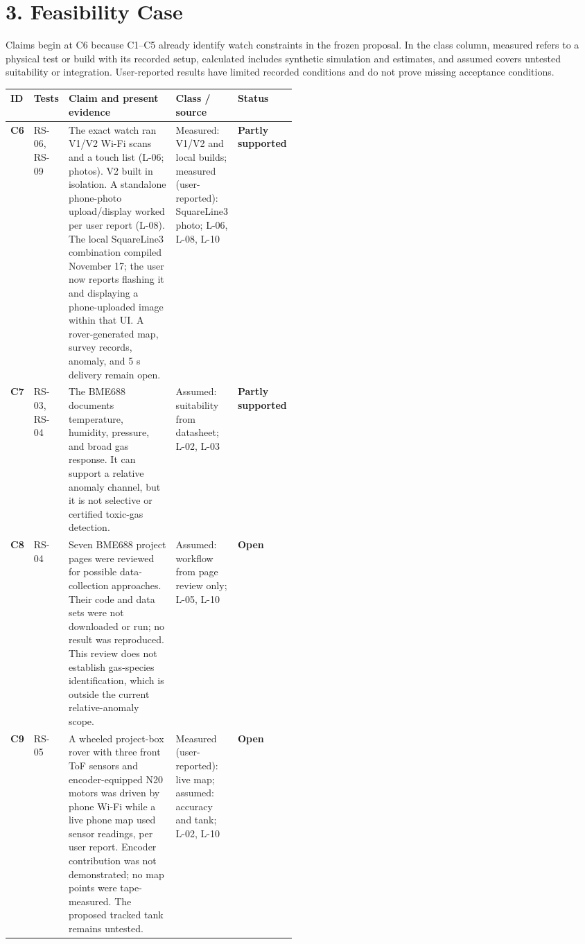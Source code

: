\documentclass[10pt,letterpaper]{article}
\renewcommand{\arraystretch}{1.12}
\newcommand{\openstatus}{\textbf{Open}}
\newcommand{\partialstatus}{\textbf{Partly supported}}
\begin{document}
\newpage
\section*{3. Feasibility Case}

Claims begin at C6 because C1--C5 already identify watch constraints in the frozen proposal. In the class column, measured refers to a physical test or build with its recorded setup, calculated includes synthetic simulation and estimates, and assumed covers untested suitability or integration. User-reported results have limited recorded conditions and do not prove missing acceptance conditions.

\begingroup\footnotesize\renewcommand{\arraystretch}{1.04}
\begin{tabularx}{\linewidth}{>{\bfseries}p{0.055\linewidth}>{\raggedright\arraybackslash}p{0.12\linewidth}X>{\raggedright\arraybackslash}p{0.18\linewidth}>{\raggedright\arraybackslash}p{0.12\linewidth}}
\toprule
ID & Tests & Claim and present evidence & Class / source & Status \\
\midrule
C6 & RS-06, RS-09 & The exact watch ran V1/V2 Wi-Fi scans and a touch list (L-06; photos). V2 built in isolation. A standalone phone-photo upload/display worked per user report (L-08). The local SquareLine3 combination compiled November 17; the user now reports flashing it and displaying a phone-uploaded image within that UI. A rover-generated map, survey records, anomaly, and 5 s delivery remain open. & Measured: V1/V2 and local builds; measured (user-reported): SquareLine3 photo; L-06, L-08, L-10 \cite{waveshare} & \partialstatus \\
C7 & RS-03, RS-04 & The BME688 documents temperature, humidity, pressure, and broad gas response. It can support a relative anomaly channel, but it is not selective or certified toxic-gas detection. & Assumed: suitability from datasheet; L-02, L-03 \cite{bosch} & \partialstatus \\
C8 & RS-04 & Seven BME688 project pages were reviewed for possible data-collection approaches. Their code and data sets were not downloaded or run; no result was reproduced. This review does not establish gas-species identification, which is outside the current relative-anomaly scope. & Assumed: workflow from page review only; L-05, L-10 & \openstatus \\
C9 & RS-05 & A wheeled project-box rover with three front ToF sensors and encoder-equipped N20 motors was driven by phone Wi-Fi while a live phone map used sensor readings, per user report. Encoder contribution was not demonstrated; no map points were tape-measured. The proposed tracked tank remains untested. & Measured (user-reported): live map; assumed: accuracy and tank; L-02, L-10 & \openstatus \\

\end{tabularx}
\end{document}
